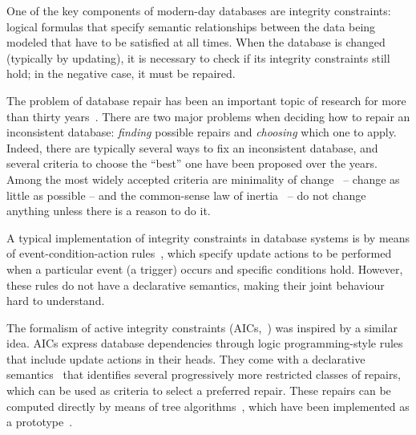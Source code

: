 One of the key components of modern-day databases are integrity constraints: logical formulas that specify semantic relationships between the data being modeled that have to be satisfied at all times.
When the database is changed (typically by updating), it is necessary to check if its integrity constraints still hold; in the negative case, it must be repaired.

The problem of database repair has been an important topic of research for more than thirty years~\cite{icdt/Abiteboul88}.
There are two major problems when deciding how to repair an inconsistent database: \emph{finding} possible repairs and \emph{choosing} which one to apply.
Indeed, there are typically several ways to fix an inconsistent database, and several criteria to choose the ``best'' one have been proposed over the years.
Among the most widely accepted criteria are minimality of change~\cite{Winslett90,ai/EiterG92} -- change as little as possible -- and the common-sense law of inertia~\cite{PrzymusinskiT97} -- do not change anything unless there is a reason to do it.

A typical implementation of integrity constraints in database systems is by means of event-condition-action rules~\cite{TenienteO95,WidomC96}, which specify update actions to be performed when a particular event (a trigger) occurs and specific conditions hold.
However, these rules do not have a declarative semantics, making their joint behaviour hard to understand.

The formalism of active integrity constraints (AICs,~\cite{ppdp/FlescaGZ04}) was inspired by a similar idea.
AICs express database dependencies through logic programming-style rules that include update actions in their heads.
They come with a declarative semantics~\cite{tplp/CaropreseT11} that identifies several progressively more restricted classes of repairs, which can be used as criteria to select a preferred repair.
These repairs can be computed directly by means of tree algorithms~\cite{tase/Cruz-FilipeEGN13}, which have been implemented as a prototype~\cite{CFHLNS15}.


